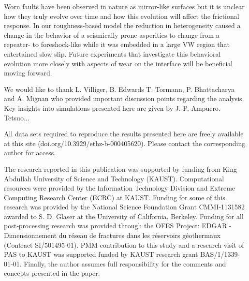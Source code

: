 \documentclass[preprint,1p, 10pt,authoryear]{elsarticle}
\begin{document}
Worn faults have been observed in nature as mirror-like surfaces but it is unclear how they truly evolve over time and how this evolution will affect the frictional response.  In our roughness-based model the reduction in heterogeneity caused a change in the behavior of a seismically prone asperities to change from a repeater- to foreshock-like while it was embedded in a large VW region that entertained slow slip.  Future experiments that investigate this behavioral evolution more closely with aspects of wear on the interface will be beneficial moving forward. 

\acknowledgments
We would like to thank L. Villiger, B. Edwards T. Tormann, P. Bhattacharya and A. Mignan who provided important discussion points regarding the analysis. Key insights into simulations presented here are given by J.-P. Ampuero. Tetsuo...

All data sets required to reproduce the results presented here are freely available at this site (doi.org/10.3929/ethz-b-000405620). Please contact the corresponding author for access.

The research reported in this publication was supported by funding from King Abdullah University of Science and Technology (KAUST). Computational resources were provided by the Information Technology Division and Extreme Computing Research Center (ECRC) at KAUST.
Funding for some of this research was provided by the National Science Foundation Grant CMMI‐1131582 awarded to S. D. Glaser at the University of California, Berkeley. Funding for all post‐processing research was provided through the OFES Project: EDGAR ‐ Dimensionnement du réseau de fractures dans les réservoirs géothermaux (Contract SI/501495‐01). PMM contribution to this study and a research visit of PAS to KAUST was supported funded by KAUST research grant BAS/1/1339-01-01. Finally, the author assumes full responsibility for the comments and concepts presented in the paper.
 

\end{document}

